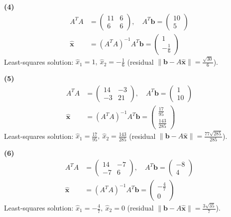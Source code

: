 \noindent\textbf{(4)}
\begin{align*}
A^TA&=\begin{pmatrix}11 & 6 \\ 6 & 6\end{pmatrix},\quad A^T\mathbf b=\begin{pmatrix}10 \\ 5\end{pmatrix} \\
\hat{\mathbf x}&=(A^TA)^{-1}A^T\mathbf b=\begin{pmatrix}1 \\ - \frac{1}{6}\end{pmatrix}
\end{align*}
Least-squares solution: $\hat x_1=1,\ \hat x_2=- \frac{1}{6}$ (residual $\|\mathbf b-A\hat{\mathbf x}\|=\frac{\sqrt{30}}{6}$).


\noindent\textbf{(5)}
\begin{align*}
A^TA&=\begin{pmatrix}14 & -3 \\ -3 & 21\end{pmatrix},\quad A^T\mathbf b=\begin{pmatrix}1 \\ 10\end{pmatrix} \\
\hat{\mathbf x}&=(A^TA)^{-1}A^T\mathbf b=\begin{pmatrix}\frac{17}{95} \\ \frac{143}{285}\end{pmatrix}
\end{align*}
Least-squares solution: $\hat x_1=\frac{17}{95},\ \hat x_2=\frac{143}{285}$ (residual $\|\mathbf b-A\hat{\mathbf x}\|=\frac{77 \sqrt{285}}{285}$).


\noindent\textbf{(6)}
\begin{align*}
A^TA&=\begin{pmatrix}14 & -7 \\ -7 & 6\end{pmatrix},\quad A^T\mathbf b=\begin{pmatrix}-8 \\ 4\end{pmatrix} \\
\hat{\mathbf x}&=(A^TA)^{-1}A^T\mathbf b=\begin{pmatrix}- \frac{4}{7} \\ 0\end{pmatrix}
\end{align*}
Least-squares solution: $\hat x_1=- \frac{4}{7},\ \hat x_2=0$ (residual $\|\mathbf b-A\hat{\mathbf x}\|=\frac{3 \sqrt{35}}{7}$).

